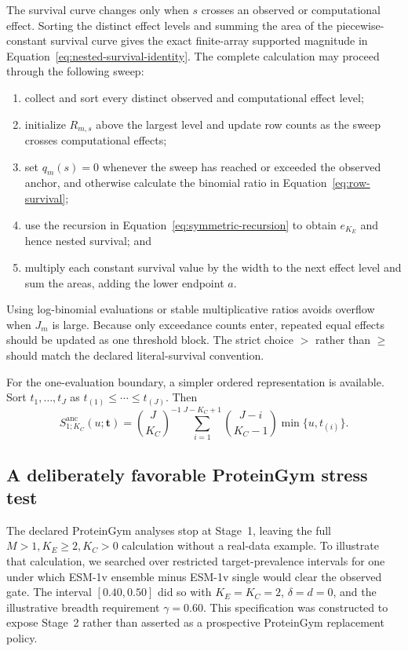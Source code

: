 \documentclass[11pt]{article}
\newcommand{\Sanc}{S^{\mathrm{anc}}}
\theoremstyle{remark}
\begin{document}
The survival curve changes only when $s$ crosses an observed or computational
effect. Sorting the distinct effect levels and summing the area of the
piecewise-constant survival curve gives the exact finite-array supported
magnitude in Equation~\eqref{eq:nested-survival-identity}. The complete
calculation may proceed through the following sweep:
\begin{enumerate}
\item collect and sort every distinct observed and computational effect level;
\item initialize $R_{m,s}$ above the largest level and update row counts as the
sweep crosses computational effects;
\item set $q_m(s)=0$ whenever the sweep has reached or exceeded the observed
anchor, and otherwise calculate the binomial ratio in
Equation~\eqref{eq:row-survival};
\item use the recursion in Equation~\eqref{eq:symmetric-recursion} to obtain
$e_{K_E}$ and hence nested survival; and
\item multiply each constant survival value by the width to the next effect
level and sum the areas, adding the lower endpoint $a$.
\end{enumerate}
Using log-binomial evaluations or stable multiplicative ratios avoids overflow
when $J_m$ is large. Because only exceedance counts enter, repeated equal
effects should be updated as one threshold block. The strict choice $>$ rather
than $\geq$ should match the declared literal-survival convention.

For the one-evaluation boundary, a simpler ordered representation is available.
Sort $t_1,\ldots,t_J$ as $t_{(1)}\leq\cdots\leq t_{(J)}$. Then
\begin{equation}
\Sanc_{1;K_C}(u;\mathbf t)
=
\binom{J}{K_C}^{-1}
\sum_{i=1}^{J-K_C+1}
\binom{J-i}{K_C-1}
\min\{u,t_{(i)}\}.
\label{eq:one-row-sorted}
\end{equation}

\subsection{A deliberately favorable ProteinGym stress test}
\label{app:proteingym-nested}

The declared ProteinGym analyses stop at Stage~1, leaving the full
$M>1,K_E\geq2,K_C>0$ calculation without a real-data example. To illustrate
that calculation, we searched over restricted target-prevalence intervals for
one under which ESM-1v ensemble minus ESM-1v single would clear the observed
gate. The interval $[0.40,0.50]$ did so with $K_E=K_C=2$, $\delta=d=0$, and
the illustrative breadth requirement $\gamma=0.60$. This specification was
constructed to expose Stage~2 rather than asserted as a prospective
ProteinGym replacement policy.
\end{document}
